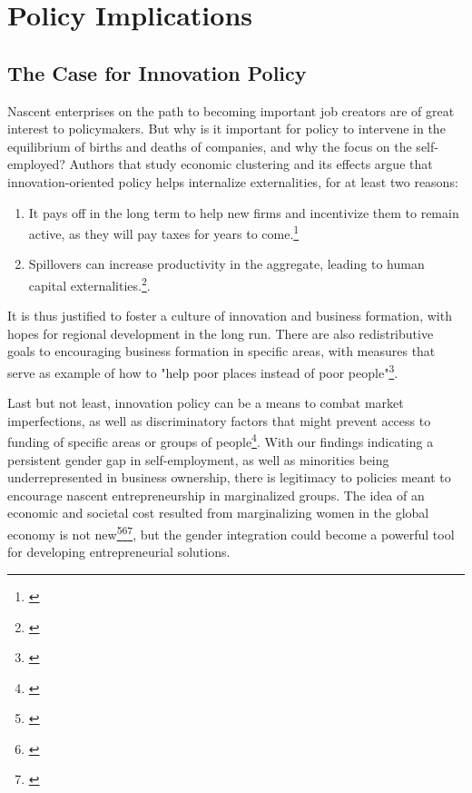 \chapter{Policy Implications\label{ch:policy}}

\section{The Case for Innovation Policy}

Nascent enterprises on the path to becoming important job creators are of great interest to policymakers. But why is it important for policy to intervene in the equilibrium of births and deaths of companies, and why the focus on the self-employed? Authors that study economic clustering and its effects argue that innovation-oriented policy helps internalize externalities, for at least two reasons: 

\renewcommand{\labelenumi}{\roman{enumi}}
\begin{enumerate}
\item It pays off in the long term to help new firms and incentivize them to remain active, as they will pay taxes for years to come.\footnote{\cite{ChatterjiGlaeserKerr2014}}
\item Spillovers can increase productivity in the aggregate, leading to human capital externalities.\footnote{\cite{Moretti2004}}. 
\end{enumerate}

It is thus justified to foster a culture of innovation and business formation, with hopes for regional development in the long run. There are also redistributive goals to encouraging business formation in specific areas, with measures that serve as example of how to "help poor places instead of poor people"\footnote{\cite{ChatterjiGlaeserKerr2014}}. 

Last but not least, innovation policy can be a means to combat market imperfections, as well as discriminatory factors that might prevent access to funding of specific areas or groups of people\footnote{\cite{ChatterjiGlaeserKerr2014}}. With our findings indicating a persistent gender gap in self-employment, as well as minorities being underrepresented in business ownership, there is legitimacy to policies meant to encourage nascent entrepreneurship in marginalized groups. The idea of an economic and societal cost resulted from marginalizing women in the global economy is not new\footnote{\cite{bakker1994strategic}}\hspace{.15em}\footnote{\cite{blank1993should}}\hspace{.15em}\footnote{\cite{boserup1970women}}, but the  gender integration could become a powerful tool for developing entrepreneurial solutions.  

